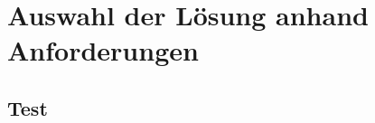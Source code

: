 
\chapter{Auswahl der Lösung anhand Anforderungen}  %
\label{cha:} %
\section{Test} %
\label{sec:} %


\subsection{} %
\label{sse:}
\subsubsection{} %
\label{sss:}
